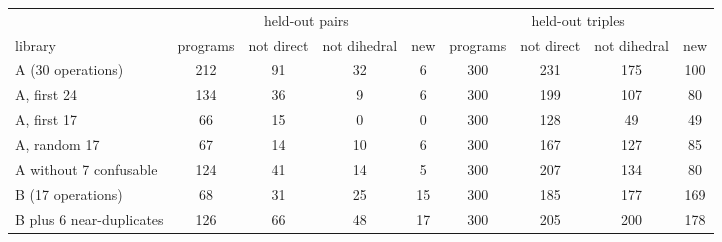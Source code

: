 \begin{tabular}{lcccccccc}\toprule
 & \multicolumn{4}{c}{held-out pairs} & \multicolumn{4}{c}{held-out triples} \\ \cmidrule(lr){2-5}\cmidrule(lr){6-9}
library & programs & not direct & not dihedral & new & programs & not direct & not dihedral & new \\ \midrule
A (30 operations) & 212 & 91 & 32 & 6 & 300 & 231 & 175 & 100 \\
A, first 24 & 134 & 36 & 9 & 6 & 300 & 199 & 107 & 80 \\
A, first 17 & 66 & 15 & 0 & 0 & 300 & 128 & 49 & 49 \\
A, random 17 & 67 & 14 & 10 & 6 & 300 & 167 & 127 & 85 \\
A without 7 confusable & 124 & 41 & 14 & 5 & 300 & 207 & 134 & 80 \\
B (17 operations) & 68 & 31 & 25 & 15 & 300 & 185 & 177 & 169 \\
B plus 6 near-duplicates & 126 & 66 & 48 & 17 & 300 & 205 & 200 & 178 \\
\bottomrule
\end{tabular}
